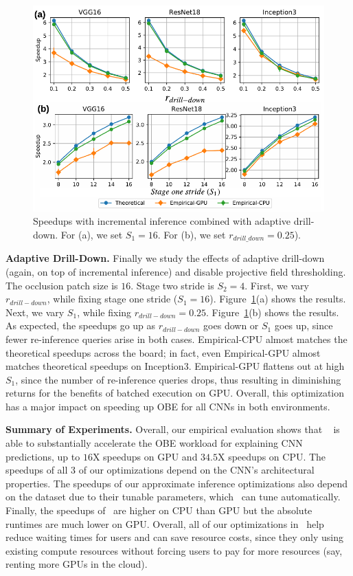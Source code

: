 \begin{figure}[t]
\includegraphics[width=\columnwidth]{images/5_2_3_edited}
\vspace{-8mm}
\caption{Speedups with incremental inference combined with adaptive drill-down. For (a), we set $S_1=16$. For (b), we set $r_{drill\_down}=0.25$).}
\label{fig:5_2_3_edited}
\end{figure}

\vspace{2mm}
\noindent \textbf{Adaptive Drill-Down.} Finally we study the effects of adaptive drill-down (again, on top of incremental inference) and disable projective field thresholding. The occlusion patch size is $16$. Stage two stride is $S_2 = 4$. First, we vary $r_{drill-down}$, while fixing stage one stride ($S_1 = 16$). Figure~\ref{fig:5_2_3_edited}(a) shows the results. Next, we vary $S_1$, while fixing $r_{drill-down} = 0.25$. Figure~\ref{fig:5_2_3_edited}(b) shows the results. As expected, the speedups go up as $r_{drill-down}$ goes down or $S_1$ goes up, since fewer re-inference queries arise in both cases. Empirical-CPU almost matches the theoretical speedups across the board; in fact, even Empirical-GPU almost matches theoretical speedups on Inception3. Empirical-GPU flattens out at high $S_1$, since the number of re-inference queries drops, thus resulting in diminishing returns for the benefits of batched execution on GPU. Overall, this optimization has a major impact on speeding up OBE for all CNNs in both environments.

\vspace{2mm}
\noindent \textbf{Summary of Experiments.} Overall, our empirical evaluation shows that \system~ is able to substantially accelerate the OBE workload for explaining CNN predictions, up to $16$X speedups on GPU and $34.5$X speedups on CPU. The speedups of all 3 of our optimizations depend on the CNN's architectural properties. The speedups of our approximate inference optimizations also depend on the dataset due to their tunable parameters, which \system ~can tune automatically. Finally, the speedups of \system ~are higher on CPU than GPU but the absolute runtimes are much lower on GPU. Overall, all of our optimizations in \system ~help reduce waiting times for users and can save resource costs, since they only using existing compute resources without forcing users to pay for more resources (say, renting more GPUs in the cloud).